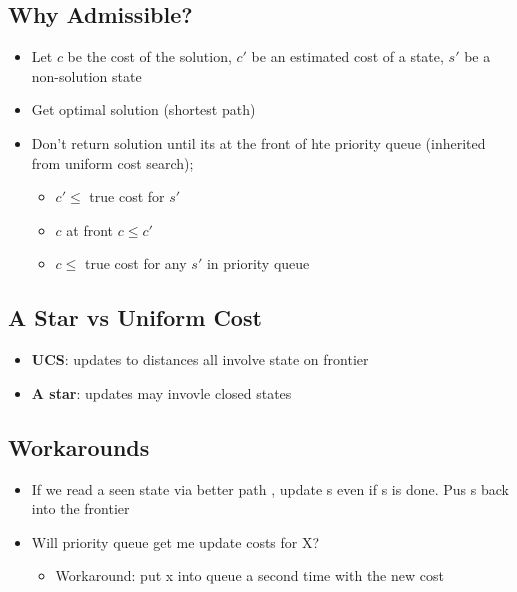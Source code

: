  \subsection{Why Admissible?}

    \begin{itemize}
      \item Let $ c $ be the cost of the solution,
      $ c' $ be an estimated cost of a state, $ s' $ be a non-solution state
      \item Get optimal solution (shortest path)
      \item Don't return solution until its at the front of hte priority
      queue (inherited from uniform cost search);
      \begin{itemize}
        \item $ c' \le $ true cost for $ s' $
        \item $ c $ at front $ c \le c' $
        \item $ c \le $ true cost for any $ s' $ in priority queue
      \end{itemize}
    \end{itemize}

  \subsection{A Star vs Uniform Cost}

    \begin{itemize}
      \item \textbf{UCS}: updates to distances all involve state on frontier
      \item \textbf{A star}: updates may invovle closed states
    \end{itemize}

  \subsection{Workarounds}

    \begin{itemize}
      \item If we read a seen state via better path , update s even if s is done. Pus s back into the frontier
      \item Will priority queue get me update costs for X?
      \begin{itemize}
        \item Workaround: put x into queue a second time with the new cost
      \end{itemize}
    \end{itemize}

